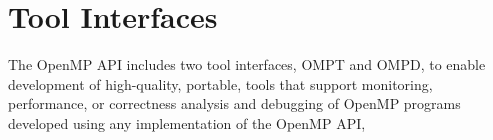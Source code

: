 %
%
%
%
%
%
%
%
%
%
%
%
%

\section{Tool Interfaces}
\label{subsec:Tool Support}

The OpenMP API includes two tool interfaces, OMPT and OMPD,
to enable development of high-quality, portable, tools that support
monitoring, performance, or correctness analysis and debugging of OpenMP programs
developed using any implementation of the OpenMP API,

